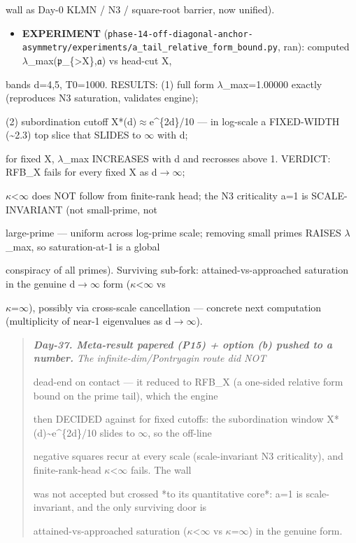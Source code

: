 \documentclass[10pt]{article}
\begin{document}
  wall as Day-0 KLMN / N3 / square-root barrier, now unified).\par
\begin{itemize}
\item \textbf{EXPERIMENT} (\texttt{phase-14-off-diagonal-anchor-asymmetry/experiments/a\_tail\_relative\_form\_bound.py}, ran): computed \ensuremath{\lambda}\_max(\ensuremath{\mathfrak{p}}\_\{>X\},\ensuremath{\mathfrak{a}}) vs head-cut X,
\end{itemize}
  bands d=4,5, T0=1000. RESULTS: (1) full form \ensuremath{\lambda}\_max=1.00000 exactly (reproduces N3 saturation, validates engine);\par
  (2) subordination cutoff X*(d)\ensuremath{\approx}e\textasciicircum{}\{2d\}/10 --- in log-scale a FIXED-WIDTH (\textasciitilde{}2.3) top slice that SLIDES to \ensuremath{\infty} with d;\par
  for fixed X, \ensuremath{\lambda}\_max INCREASES with d and recrosses above 1. VERDICT: RFB\_X fails for every fixed X as d\ensuremath{\to}\ensuremath{\infty};\par
  \ensuremath{\kappa}<\ensuremath{\infty} does NOT follow from finite-rank head; the N3 criticality a=1 is SCALE-INVARIANT (not small-prime, not\par
  large-prime --- uniform across log-prime scale; removing small primes RAISES \ensuremath{\lambda}\_max, so saturation-at-1 is a global\par
  conspiracy of all primes). Surviving sub-fork: attained-vs-approached saturation in the genuine d\ensuremath{\to}\ensuremath{\infty} form (\ensuremath{\kappa}<\ensuremath{\infty} vs\par
  \ensuremath{\kappa}=\ensuremath{\infty}), possibly via cross-scale cancellation --- concrete next computation (multiplicity of near-1 eigenvalues as d\ensuremath{\to}\ensuremath{\infty}).\par

\begin{quote}\itshape
\textbf{Day-37. Meta-result papered (P15) + option (b) pushed to a number.} The infinite-dim/Pontryagin route did NOT\par
dead-end on contact --- it reduced to RFB\_X (a one-sided relative form bound on the prime tail), which the engine\par
then DECIDED against for fixed cutoffs: the subordination window X*(d)\textasciitilde{}e\textasciicircum{}\{2d\}/10 slides to \ensuremath{\infty}, so the off-line\par
negative squares recur at every scale (scale-invariant N3 criticality), and finite-rank-head \ensuremath{\kappa}<\ensuremath{\infty} fails. The wall\par
was not accepted but crossed *to its quantitative core*: a=1 is scale-invariant, and the only surviving door is\par
attained-vs-approached saturation (\ensuremath{\kappa}<\ensuremath{\infty} vs \ensuremath{\kappa}=\ensuremath{\infty}) in the genuine form.\par
\end{quote}
\end{document}

